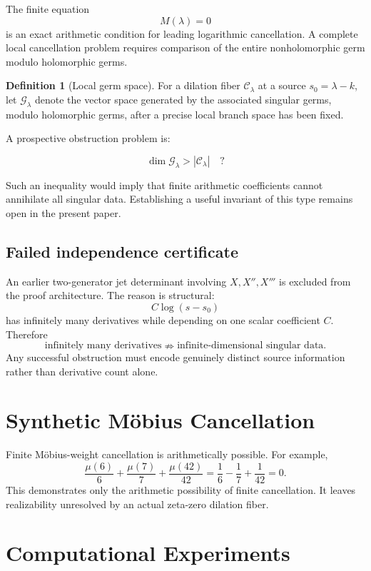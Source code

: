 \documentclass[11pt]{article}
\theoremstyle{definition}
\newtheorem{definition}[theorem]{Definition}
\newcommand{\C}{\mathcal C}
\begin{document}
The finite equation
\[
M(\lambda)=0
\]
is an exact arithmetic condition for leading logarithmic cancellation. A complete local cancellation problem requires comparison of the entire nonholomorphic germ modulo holomorphic germs.

\begin{definition}[Local germ space]
For a dilation fiber $\C_\lambda$ at a source $s_0=\lambda-k$, let $\mathcal G_\lambda$ denote the vector space generated by the associated singular germs, modulo holomorphic germs, after a precise local branch space has been fixed.
\end{definition}

A prospective obstruction problem is:

\[
\boxed{
\dim\mathcal G_\lambda>|\C_\lambda|\quad ?
}
\]

Such an inequality would imply that finite arithmetic coefficients cannot annihilate all singular data. Establishing a useful invariant of this type remains open in the present paper.

\subsection{Failed independence certificate}

An earlier two-generator jet determinant involving $X,X'',X'''$ is excluded from the proof architecture. The reason is structural:
\[
C\log(s-s_0)
\]
has infinitely many derivatives while depending on one scalar coefficient $C$. Therefore
\[
\text{infinitely many derivatives}
\nRightarrow
\text{infinite-dimensional singular data}.
\]
Any successful obstruction must encode genuinely distinct source information rather than derivative count alone.

\section{Synthetic Möbius Cancellation}
\label{sec:synthetic}

Finite Möbius-weight cancellation is arithmetically possible. For example,
\[
\frac{\mu(6)}6+
\frac{\mu(7)}7+
\frac{\mu(42)}{42}
=
\frac16-\frac17+\frac1{42}=0.
\]
This demonstrates only the arithmetic possibility of finite cancellation. It leaves realizability unresolved by an actual zeta-zero dilation fiber.

\section{Computational Experiments}
\end{document}
